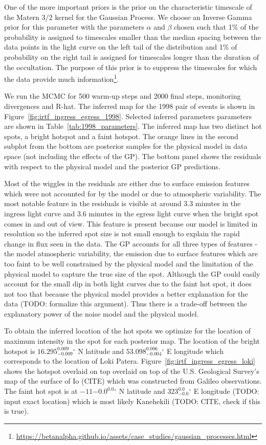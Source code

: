 \documentclass[modern]{aastex62}
\begin{document}
One of the more important priors is the prior on the characteristic timescale of the Matern 3/2 kernel for the Gaussian Process. 
We choose an Inverse Gamma prior for this parameter with the parameters $\alpha$ and $\beta$ chosen such that 1\% of the probability is assigned to timescales smaller than the median spacing between the data points in the light curve  on the left tail of the distribution and 1\% of probability on the right tail is assigned for timescales longer than the duration of the occultation. 
The purpose of this prior is to suppress the timescales for which the data provide much information\footnote{ \url{https://betanalpha.github.io/assets/case_studies/gaussian_processes.html}}.

We run the MCMC for 500 warm-up steps and 2000 final steps, monitoring divergences and R-hat.
The inferred map for the 1998 pair of events is shown in Figure~\ref{fig:irtf_ingress_egress_1998}.
Selected inferred parameters parameters are shown in Table~\ref{tab:1998_parameters}. 
The inferred map has two distinct hot spots, a bright hotspot and a faint hotspot.
The orange lines in the second subplot from the bottom are posterior samples for the physical model in data space (not including the effects of the GP).
The bottom panel shows the residuals with respect to the physical model and the posterior GP predictions.

Most of the wiggles in the residuals are either due to surface emission features which were not accounted for by the model or due to atmospheric variability.
The most notable feature in the residuals is visible at around 3.3 minutes in the ingress light curve and 3.6 minutes in the egress light curve when the bright spot comes in and out of view. 
This feature is present because our model is limited in resolution so the inferred spot size is not small enough to explain the rapid change in flux seen in the data.
The GP accounts for all three types of features - the model atmospheric variability, the emission due to surface features which are too faint to be well constrained by the physical model and the limitation of the physical model to capture the true size of the spot. 
Although the GP could easily account for the small dip in both light curves due to the faint hot spot, it does not too that because the physical model provides a better explanation for the data (TODO: formalize this argument).
Thus there is a trade-off between the explanatory power of the noise model and the physical model.

To obtain the inferred location of the hot spots we optimize for the location of maximum intensity in the spot for each posterior map. 
The location of the bright hotspot is $16.295_{-0.009}^{0.009}$$^\circ$ N latitude and $53.098_{-0.004}^{0.006}$$^\circ$ E longitude which corresponds to the location of Loki Patera.
Figure~\ref{fig:irtf_ingress_egress_loki} shows the hotspot overlaid on top overlaid on top of the U.S. Geological Survey's map of the surface of Io (CITE) which was constructed from Galileo observations.
The faint hot spot is at $-11{-0.0}^{0.0}$$^\circ$ N latitude and $323_{-0.0}^{0.0}$$^\circ$ E longitude (TODO: input exact location) which is most likely Kanehekili (TODO: CITE, check if this is true).
\end{document}
